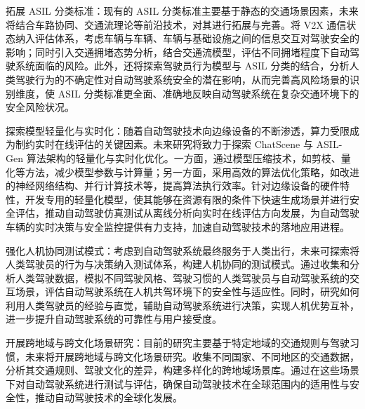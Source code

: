 拓展 ASIL 分类标准：现有的 ASIL 分类标准主要基于静态的交通场景因素，未来将结合车路协同、交通流理论等前沿技术，对其进行拓展与完善。将 V2X 通信状态纳入评估体系，考虑车辆与车辆、车辆与基础设施之间的信息交互对驾驶安全的影响；同时引入交通拥堵态势分析，结合交通流模型，评估不同拥堵程度下自动驾驶系统面临的风险。此外，还将探索驾驶员行为模型与 ASIL 分类的结合，分析人类驾驶行为的不确定性对自动驾驶系统安全的潜在影响，从而完善高风险场景的识别维度，使 ASIL 分类标准更全面、准确地反映自动驾驶系统在复杂交通环境下的安全风险状况。​

探索模型轻量化与实时化：随着自动驾驶技术向边缘设备的不断渗透，算力受限成为制约实时在线评估的关键因素。未来研究将致力于探索 ChatScene 与 ASIL-Gen 算法架构的轻量化与实时化优化。一方面，通过模型压缩技术，如剪枝、量化等方法，减少模型参数与计算量；另一方面，采用高效的算法优化策略，如改进的神经网络结构、并行计算技术等，提高算法执行效率。针对边缘设备的硬件特性，开发专用的轻量化模型，使其能够在资源有限的条件下快速生成场景并进行安全评估，推动自动驾驶仿真测试从离线分析向实时在线评估方向发展，为自动驾驶车辆的实时决策与安全监控提供有力支持，加速自动驾驶技术的落地应用进程。​

强化人机协同测试模式：考虑到自动驾驶系统最终服务于人类出行，未来可探索将人类驾驶员的行为与决策纳入测试体系，构建人机协同的测试模式。通过收集和分析人类驾驶数据，模拟不同驾驶风格、驾驶习惯的人类驾驶员与自动驾驶系统的交互场景，评估自动驾驶系统在人机共驾环境下的安全性与适应性。同时，研究如何利用人类驾驶员的经验与直觉，辅助自动驾驶系统进行决策，实现人机优势互补，进一步提升自动驾驶系统的可靠性与用户接受度。​

开展跨地域与跨文化场景研究：目前的研究主要基于特定地域的交通规则与驾驶习惯，未来将开展跨地域与跨文化场景研究。收集不同国家、不同地区的交通数据，分析其交通规则、驾驶文化的差异，构建多样化的跨地域场景库。通过在这些场景下对自动驾驶系统进行测试与评估，确保自动驾驶技术在全球范围内的适用性与安全性，推动自动驾驶技术的全球化发展。







\newpage
